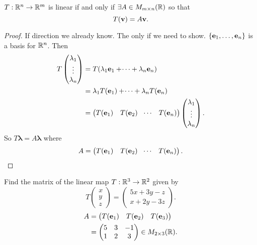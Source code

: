 \documentclass[10pt, a4paper]{article}
\begin{document}
\begin{lemma}
    $T : \mathbb{R} ^ n \rightarrow \mathbb{R} ^ m$ is linear if and only if $\exists A \in M_{m \times n}(\mathbb{R})$ so that
    \[
    T(\mathbf{v}) = A\mathbf{v}.
    \]
    \begin{proof}
        If direction we already know.
        The only if we need to show.
        $\{\mathbf{e}_1, \dotsc, \mathbf{e}_n\}$ is a basis for $\mathbb{R} ^ n$.
        Then
        \begin{align*}
            T\begin{pmatrix}
                \lambda_1 \\ \vdots \\ \lambda_n
            \end{pmatrix} &= T(\lambda_1\mathbf{e}_1 + \dotsi + \lambda_n\mathbf{e}_n) \\
            &= \lambda_1T(\mathbf{e}_1) + \dotsi + \lambda_nT(\mathbf{e}_n) \\
            &= \begin{pmatrix}
                T(\mathbf{e}_1) & T(\mathbf{e}_2) & \dotsi & T(\mathbf{e}_n)
            \end{pmatrix}\begin{pmatrix}
                \lambda_1 \\ \vdots \\ \lambda_n
            \end{pmatrix}.
        \end{align*}
        So $T\pmb{\lambda} = A\pmb{\lambda}$ where
        \[
        A = \begin{pmatrix}
                T(\mathbf{e}_1) & T(\mathbf{e}_2) & \dotsi & T(\mathbf{e}_n)
            \end{pmatrix}.
        \]
    \end{proof}
\end{lemma}

\begin{example}
    Find the matrix of the linear map $T : \mathbb{R} ^ 3 \rightarrow \mathbb{R} ^ 2$ given by
    \[
    T\begin{pmatrix}
        x \\ y \\ z
    \end{pmatrix} = \begin{pmatrix}
        5x + 3y - z \\ x + 2y - 3z
    \end{pmatrix}.
    \]
    \begin{align*}
        A &= \begin{pmatrix}
            T(\mathbf{e}_1) & T(\mathbf{e}_2) & T(\mathbf{e}_3)
        \end{pmatrix} \\
        &= \begin{pmatrix}
            5 & 3 & -1 \\ 1 & 2 & 3
        \end{pmatrix} \in M_{2 \times 3}(\mathbb{R}).
    \end{align*}
\end{example}
\end{document}
